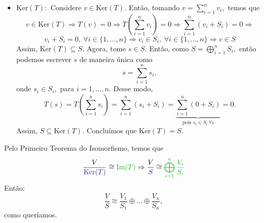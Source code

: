 \documentclass[11pt,a4paper]{article}
\begin{document}
{\begin{itemize}
\[    \]
    Logo, $T$ é sobrejetora, e 
    \[
    \mbox{Im}(T) = \bigoplus\limits_{i=1}^n  \frac{V_i}{S_i} =  \frac{V_1}{S_1} \oplus \ldots \oplus \frac{V_n}{S_n} 
    \]
    \item $\mbox{Ker} (T):$ Considere $v \in \mbox{Ker}(T).$ Então, tomando $v = \sum\limits_{i=1}^n v_i,$ temos que
    \[
 v \in \mbox{Ker}(T) \Rightarrow T(v) = 0 \Rightarrow T\left(\sum\limits_{i=1}^n v_i \right) = 0 \Rightarrow \sum\limits_{i=1}^n (v_i + S_i) = 0 \Rightarrow \]\[v_i + S_i = 0, \ \forall i \in  \{1, \ldots, n\} \Rightarrow v_i \in S_i , \ \forall i \in  \{1, \ldots, n\} \Rightarrow v \in S
    \]
    Assim, $\mbox{Ker}(T) \subseteq S.$
    Agora, tome $s \in S.$ Então, como $S = \bigoplus\limits_{i=1}^n S_i,$ então podemos escrever $s$ de maneira única como
    \[
    s = \sum\limits_{i = 1}^n s_i,
    \]
    onde $s_i \in S_i,$ para $i = 1, \dots, n.$
    Desse modo,
    \[
    T(s) = T\left(  \sum\limits_{i = 1}^n s_i \right) = \sum\limits_{i = 1}^n (s_i + S_i) = \underbrace{\sum\limits_{i = 1}^n (0 + S_i)}_{\mbox{pois } s_i \in S_i \ \forall i} = 0.
    \]
    Assim, $S \subseteq \mbox{Ker}(T).$
    Concluímos que $\mbox{Ker}(T) = S.$
\end{itemize}

Pelo Primeiro Teorema do Isomorfismo, temos que
\[
    \frac{V}{\textcolor{Blue}{\mbox{Ker}(T)}} \cong \textcolor{Verde}{\mbox{Im}(T)} \Rightarrow  \frac{V}{\textcolor{Blue}{S}} \cong \textcolor{Verde}{ \bigoplus\limits_{i=1}^n  \frac{V_i}{S_i}} 
\]
Então:
\[
\frac{V}{S} \cong \frac{V_1}{S_1} \oplus \ldots \oplus \frac{V_n}{S_n},
\]
como queríamos.
}
\end{document}

